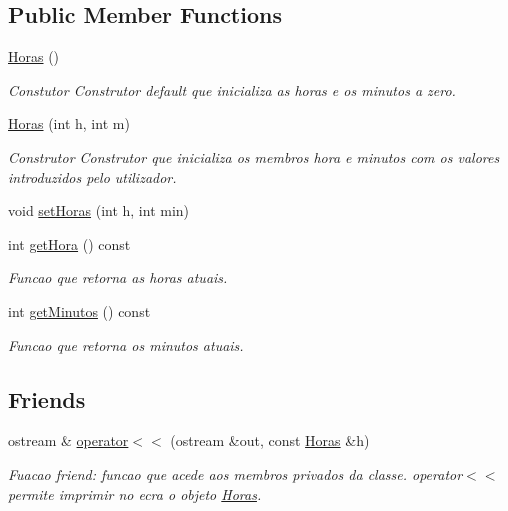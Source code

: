 \subsection*{Public Member Functions}
\begin{DoxyCompactItemize}
\item 
\hypertarget{class_horas_aeef70cbde1c7253dfbb2135fbadc483b}{}\hyperlink{class_horas_aeef70cbde1c7253dfbb2135fbadc483b}{Horas} ()\label{class_horas_aeef70cbde1c7253dfbb2135fbadc483b}

\begin{DoxyCompactList}\small\item\em Constutor Construtor default que inicializa as horas e os minutos a zero. \end{DoxyCompactList}\item 
\hypertarget{class_horas_abbbba3d917352ba3350cafe29753c60f}{}\hyperlink{class_horas_abbbba3d917352ba3350cafe29753c60f}{Horas} (int h, int m)\label{class_horas_abbbba3d917352ba3350cafe29753c60f}

\begin{DoxyCompactList}\small\item\em Construtor Construtor que inicializa os membros hora e minutos com os valores introduzidos pelo utilizador. \end{DoxyCompactList}\item 
void \hyperlink{class_horas_a5da58fcd1a263e3c97e6e11c35b61d76}{set\+Horas} (int h, int min)
\item 
int \hyperlink{class_horas_af72b7e4e7206236f8dc9a4d4b68eff0c}{get\+Hora} () const 
\begin{DoxyCompactList}\small\item\em Funcao que retorna as horas atuais. \end{DoxyCompactList}\item 
int \hyperlink{class_horas_a51e1dd7ac2811960ac1c2faacd034a3c}{get\+Minutos} () const 
\begin{DoxyCompactList}\small\item\em Funcao que retorna os minutos atuais. \end{DoxyCompactList}\end{DoxyCompactItemize}
\subsection*{Friends}
\begin{DoxyCompactItemize}
\item 
ostream \& \hyperlink{class_horas_ad76a7152a5b1492bcda5507aa928db73}{operator$<$$<$} (ostream \&out, const \hyperlink{class_horas}{Horas} \&h)
\begin{DoxyCompactList}\small\item\em Fuacao friend\+: funcao que acede aos membros privados da classe. operator$<$$<$ permite imprimir no ecra o objeto \hyperlink{class_horas}{Horas}. \end{DoxyCompactList}\end{DoxyCompactItemize}


